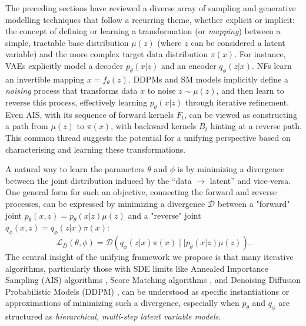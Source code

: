 The preceding sections have reviewed a diverse array of sampling and generative modelling techniques that follow a recurring theme, whether explicit or implicit: the concept of defining or learning a transformation (or \emph{mapping}) between a simple, tractable base distribution $\mu(z)$ (where $z$ can be considered a latent variable) and the more complex target data distribution $\pi(x)$. For instance, VAEs explicitly model a decoder $p_\theta(x|z)$ and an encoder $q_\phi(z|x)$. NFs learn an invertible mapping $x=f_\theta(z)$. DDPMs and SM models implicitly define a \emph{noising} process that transforms data $x$ to noise $z \sim \mu(z)$, and then learn to reverse this process, effectively learning $p_\theta(x|z)$ through iterative refinement. Even AIS, with its sequence of forward kernels $F_t$, can be viewed as constructing a path from $\mu(z)$ to $\pi(x)$, with backward kernels $B_t$ hinting at a reverse path. This common thread suggests the potential for a unifying perspective based on characterising and learning these transformations.

A natural way to learn the parameters $\theta$ and $\phi$ is by minimizing a divergence between the joint distribution induced by the ``data $\to$ latent'' and vice-versa. One general form for such an objective, connecting the forward and reverse processes, can be expressed by minimizing a divergence $\mathcal{D}$ between a "forward" joint $p_\theta(x,z) = p_\theta(x|z)\mu(z)$ and a "reverse" joint $q_\phi(x,z) = q_\phi(z|x)\pi(x)$:
\begin{equation}
    \label{eq:divergence_loss_conceptual}
    \mathcal{L}_D(\theta, \phi) = \mathcal{D}\left( q_\phi(z|x)\pi(x) \mid\mid p_\theta(x|z)\mu(z) \right).
\end{equation}
The central insight of the unifying framework we propose is that many iterative algorithms, particularly those with SDE limits like Annealed Importance Sampling (AIS) algorithms \parencite{neal2001annealed,jarzynski1997equilibrium,jarzynski1997nonequilibrium}, Score Matching algorithms \parencite{song2019generative,song2020score}, and Denoising Diffusion Probabilistic Models (DDPM) \parencite{ho2020denoising}, can be understood as specific instantiations or approximations of minimizing such a divergence, especially when $p_\theta$ and $q_\phi$ are structured as \emph{hierarchical, multi-step latent variable models}.

